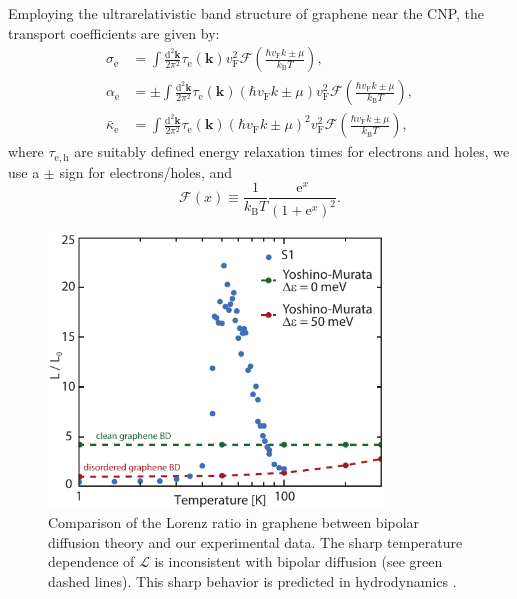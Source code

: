 Employing the ultrarelativistic band structure of graphene near the CNP, the transport coefficients are given by:
 \begin{subequations}\begin{align}
\sigma_{\mathrm{e}} &= \int \frac{\mathrm{d}^2\mathbf{k}}{2\pi^2} \tau_{\mathrm{e}}(\mathbf{k})  v_{\mathrm{F}}^2 \mathcal{F}\left(\frac{\hbar v_{\mathrm{F}} k \pm \mu}{k_{\mathrm{B}}T}\right), \\
\alpha_{\mathrm{e}} &= \pm \int \frac{\mathrm{d}^2\mathbf{k}}{2\pi^2} \tau_{\mathrm{e}}(\mathbf{k}) (\hbar v_{\mathrm{F}} k \pm \mu) v_{\mathrm{F}}^2 \mathcal{F}\left(\frac{\hbar v_{\mathrm{F}} k \pm \mu}{k_{\mathrm{B}}T}\right), \\
\bar\kappa_{\mathrm{e}} &= \int \frac{\mathrm{d}^2\mathbf{k}}{2\pi^2} \tau_{\mathrm{e}}(\mathbf{k}) (\hbar v_{\mathrm{F}} k \pm \mu)^2 v_{\mathrm{F}}^2\mathcal{F}\left(\frac{\hbar v_{\mathrm{F}} k \pm \mu}{k_{\mathrm{B}}T}\right),
\end{align}\end{subequations}
where $\tau_{\mathrm{e,h}}$ are suitably defined energy relaxation times for electrons and holes, we use a $\pm$ sign for electrons/holes,  and \begin{equation}
\mathcal{F}(x) \equiv \frac{1}{k_{\mathrm{B}}T} \frac{\mathrm{e}^x}{(1+\mathrm{e}^x)^2}.
\end{equation}

\begin{figure}
\centering
\includegraphics[width=3.5in]{figures/Dirac_fluid/LorenzComparison.pdf}
\caption{Comparison of the Lorenz ratio in graphene between bipolar diffusion theory \cite{yoshino_significant_2015} and our experimental data. The sharp temperature dependence of $\mathcal{L}$ is  inconsistent with bipolar diffusion (see green dashed lines).  This sharp behavior is predicted in hydrodynamics \cite{lucas_transport_2016}.}
\label{Fig:DF_LorenzComparison}
\end{figure}

